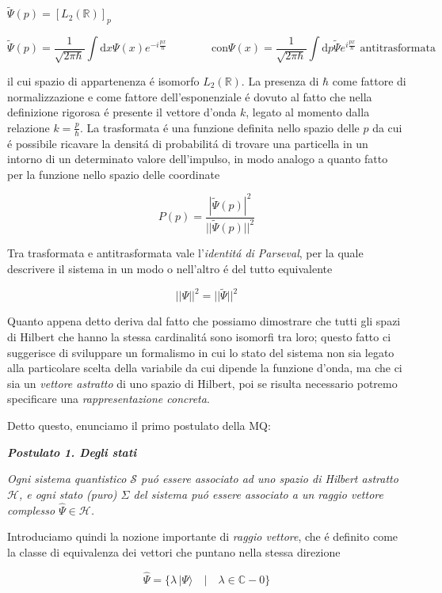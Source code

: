${\tilde{\Psi}}(p)=\left[L_{2}(\mathbb{R})\right]_{p}$

$$\tilde{\Psi}(p) = \frac{1}{\sqrt{2\pi\hbar}} \int \mathrm{d}x \Psi(x) e^{-i\frac{px}{\hbar}} \qquad\qquad \text{con} \Psi(x) = \frac{1}{\sqrt{2\pi\hbar}} \int \mathrm{d}p \tilde{\Psi} e^{i\frac{px}{\hbar}} \text{ antitrasformata}$$

il cui spazio di appartenenza \'e isomorfo $L_2(\mathbb{R})$. La presenza di $\hbar$ come fattore di normalizzazione e come fattore dell'esponenziale \'e dovuto al fatto che nella definizione rigorosa \'e presente il vettore d'onda $k$, legato al momento dalla relazione $k = \frac{p}{\hbar}$. La trasformata \'e una funzione definita nello spazio delle $p$ da cui \'e possibile ricavare la densit\'a di probabilit\'a di trovare una particella in un intorno di un determinato valore dell'impulso, in modo analogo a quanto fatto per la funzione nello spazio delle coordinate

$$P(p)=\frac{|\tilde{\Psi}(p)|^{2}}{||\tilde{\Psi}(p)||^{2}}$$

Tra trasformata e antitrasformata vale l'\textit{identit\'a di Parseval}, per la quale descrivere il sistema in un modo o nell'altro \'e del tutto equivalente 

$$||\Psi||^2 = ||\tilde{\Psi}||^2$$

Quanto appena detto deriva dal fatto che possiamo dimostrare che tutti gli spazi di Hilbert che hanno la stessa cardinalit\'a sono isomorfi tra loro; questo fatto ci suggerisce di sviluppare un formalismo in cui lo stato del sistema non sia legato alla particolare scelta della variabile da cui dipende la funzione d'onda, ma che ci sia un \textit{vettore astratto} di uno spazio di Hilbert, poi se risulta necessario potremo specificare una \textit{rappresentazione concreta}.

Detto questo, enunciamo il primo postulato della MQ:

\textbf{\textit{Postulato 1. Degli stati}} 

\textit{Ogni sistema quantistico $\mathcal{S}$ pu\'o essere associato ad uno spazio di Hilbert astratto $\mathcal{H}$, e ogni stato (puro) $\Sigma$ del sistema pu\'o essere associato a un raggio vettore complesso $\hat{\Psi} \in \mathcal{H}$.}

Introduciamo quindi la nozione importante di \textit{raggio vettore}, che \'e definito come la classe di equivalenza dei vettori che puntano nella stessa direzione

$${\hat{\Psi}}=\{\lambda\,|\Psi\rangle\quad\big|\quad\lambda\in\mathbb{C}-0\}$$

